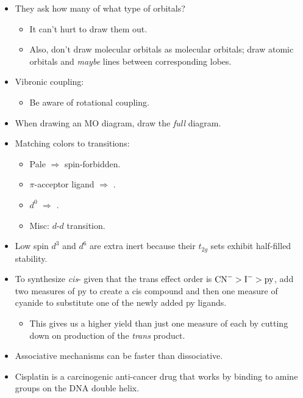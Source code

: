 \documentclass[../notes.tex]{subfiles}
\begin{document}
\begin{itemize}
    \item They ask how many of what type of orbitals?
    \begin{itemize}
        \item It can't hurt to draw them out.
        \item Also, don't draw molecular orbitals as molecular orbitals; draw atomic orbitals and \emph{maybe} lines between corresponding lobes.
    \end{itemize}
    \item Vibronic coupling:
    \begin{itemize}
        \item Be aware of rotational coupling.
    \end{itemize}
    \item When drawing an MO diagram, draw the \emph{full} diagram.
    \item Matching colors to transitions:
    \begin{itemize}
        \item Pale $\Rightarrow$ spin-forbidden.
        \item $\pi$-acceptor ligand $\Rightarrow$ .
        \item $d^0$ $\Rightarrow$ .
        \item Misc: $d$-$d$ transition.
    \end{itemize}
    \item Low spin $d^3$ and $d^6$ are extra inert because their $t_{2g}$ sets exhibit half-filled stability.
    \item To synthesize \emph{cis}-\ce{[PtI2(py)CN)]-} given that the trans effect order is $\ce{CN-}>\ce{I-}>\text{py}$, add two measures of py to create a cis compound and then one measure of cyanide to substitute one of the newly added py ligands.
    \begin{itemize}
        \item This gives us a higher yield than just one measure of each by cutting down on production of the \emph{trans} product.
    \end{itemize}
    \item Associative mechanisms can be faster than dissociative.
    \item Cisplatin is a carcinogenic anti-cancer drug that works by binding to amine groups on the DNA double helix.
\end{itemize}
\end{document}
